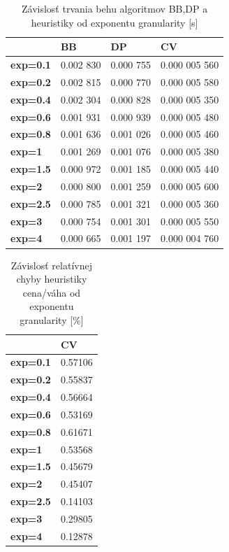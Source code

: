 \documentclass[slovak]{article}
\begin{document}
\begin{table}[htb!]\centering
	\begin{tabularx}{\textwidth}{ | X | X | X | X |}
	  \hline                       
							& \textbf{BB} 	& \textbf{DP} 	& \textbf{CV} 	\\ \hline
		\textbf{exp=0.1}	&	0.002 830		&	0.000 755		&	0.000 005 560			\\ \hline
		\textbf{exp=0.2}	&	0.002 815		&	0.000 770		&	0.000 005 580			\\ \hline
		\textbf{exp=0.4}	&	0.002 304		&	0.000 828		&	0.000 005 350			\\ \hline
		\textbf{exp=0.6}	&	0.001 931		&	0.000 939		&	0.000 005 480			\\ \hline
		\textbf{exp=0.8}	&	0.001 636		&	0.001 026		&	0.000 005 460			\\ \hline
		\textbf{exp=1}		&	0.001 269		&	0.001 076		&	0.000 005 380			\\ \hline
		\textbf{exp=1.5}	&	0.000 972		&	0.001 185		&	0.000 005 440			\\ \hline
		\textbf{exp=2}		&	0.000 800		&	0.001 259		&	0.000 005 600			\\ \hline
		\textbf{exp=2.5}	&	0.000 785		&	0.001 321		&	0.000 005 360			\\ \hline
		\textbf{exp=3}		&	0.000 754		&	0.001 301		&	0.000 005 550			\\ \hline
		\textbf{exp=4}		&	0.000 665		&	0.001 197		&	0.000 004 760			\\ \hline
	\end{tabularx}	
\caption{Závislosť trvania behu algoritmov BB,DP a heuristiky od exponentu granularity [s]}
\label{tab7}
\end{table}

\begin{table}[htb!]\centering
	\begin{tabularx}{\textwidth}{ | X | X | }
	  \hline                       
							& \textbf{CV} 	\\ \hline
		\textbf{exp=0.1}	&	0.57106
			\\ \hline
		\textbf{exp=0.2}	&	0.55837
			\\ \hline
		\textbf{exp=0.4}	&	0.56664
			\\ \hline
		\textbf{exp=0.6}	&	0.53169
			\\ \hline
		\textbf{exp=0.8}	&	0.61671
			\\ \hline
		\textbf{exp=1}		&	0.53568
			\\ \hline
		\textbf{exp=1.5}	&	0.45679
			\\ \hline
		\textbf{exp=2}		&	0.45407
			\\ \hline
		\textbf{exp=2.5}	&	0.14103
			\\ \hline
		\textbf{exp=3}		&	0.29805
			\\ \hline
		\textbf{exp=4}		&	0.12878
			\\ \hline
	\end{tabularx}
\caption{Závislosť relatívnej chyby heuristiky cena/váha od exponentu granularity [\%]}
\label{tab8}
\end{table}
\end{document}
